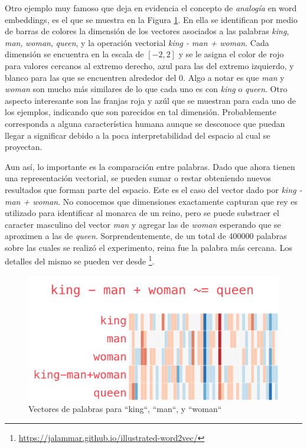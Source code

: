 Otro ejemplo muy famoso que deja en evidencia el concepto de \emph{analogía} en
word embeddings, es el que se muestra en la Figura \ref{fig:king-queen-example}.
En ella se identifican por medio de barras de colores la dimensión de los
vectores asociados a las palabras \emph{king}, \emph{man}, \emph{woman},
\emph{queen}, y la operación vectorial \emph{king - man + woman}. Cada dimensión
se encuentra en la escala de $[-2, 2]$ y se le asigna el color de rojo para
valores cercanos al extremo derecho, azul para las del extremo izquierdo, y
blanco para las que se encuentren alrededor del 0.  Algo a notar es que
\emph{man} y \emph{woman} son mucho más similares de lo que cada uno es con
\emph{king} o \emph{queen}. Otro aspecto interesante son las franjas roja y azúl
que se muestran para cada uno de los ejemplos, indicando que son parecidos en
tal dimensión. Probablemente corresponda a alguna característica humana aunque
se desconoce que puedan llegar a significar debido a la poca interpretabilidad
del espacio al cual se proyectan.

Aun así, lo importante es la comparación entre palabras. Dado que ahora tienen
una representación vectorial, se pueden sumar o restar obteniendo nuevos
resultados que forman parte del espacio. Este es el caso del vector dado por
\emph{king - man + woman}. No conocemos que dimensiones exactamente capturan que
rey es utilizado para identificar al monarca de un reino, pero se puede
substraer el caracter masculino del vector \emph{man} y agregar las de
\emph{woman} esperando que se aproximen a las de \emph{queen}.
Sorprendentemente, de un total de 400000 palabras sobre las cuales se realizó el
experimento, reina fue la palabra más cercana. Los detalles del mismo se pueden
ver desde \footnote{\url{https://jalammar.github.io/illustrated-word2vec/}}.

\begin{figure}
    \centering
    \includegraphics[scale=0.68]{figures/king-analogy-viz.png}
    \caption{Vectores de palabras para ``king``, ``man``, y ``woman``}
    \label{fig:king-queen-example}
\end{figure}

